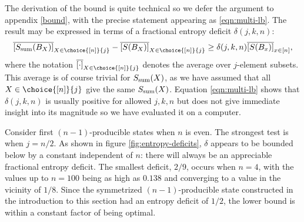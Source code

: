 \documentclass[12pt]{article}
\newcommand{\be}{\begin{equation}}
\newcommand{\ee}{\end{equation}}
\numberwithin{equation}{section}
\begin{document}
The derivation of the bound is quite technical so we defer the argument to appendix \ref{bound}, with the precise statement appearing as \eqref{eqn:multi-lb}.    The result may be expressed in terms of a fractional entropy deficit $\delta(j,k,n)$:
\be
\label{eqn:avbound}
\overline{[ S_{\rm{sum}}(B_X) ]}_{X \in \choice{[n]}{j}} - \overline{[ S(B_X) ]}_{X \in \choice{[n]}{j}}
\geq \delta(j,k,n) \overline{[ S(B_x)]}_{x \in [n]},
\ee
where the notation $\overline{[ \cdot ]}_{X \in \choice{[n]}{j}}$ denotes the average over $j$-element subsets.  This average is of course trivial for $S_{\rm{sum}}(X)$, as we have assumed that all $X \in \choice{[n]}{j}$ give the same $S_{\rm{sum}}(X)$.   Equation \eqref{eqn:multi-lb} shows that $\delta(j,k,n)$ is usually positive for allowed $j,k,n$ but does not give immediate insight into its magnitude so we have evaluated it on a computer.

Consider first $(n-1)$-producible states when $n$ is even. The strongest test is when $j = n/2$.  As shown in figure \ref{fig:entropy-deficits}, $\delta$ appears to be bounded below by a constant independent of $n$: there will always be an appreciable fractional entropy deficit. The smallest deficit, $2/9$, occurs when $n=4$, with the values up to $n=100$ being as high as $0.138$ and converging to a value in the vicinity of $1/8$. Since the symmetrized $(n-1)$-producible state constructed in the introduction to this section had an entropy deficit of $1/2$, the lower bound is within a constant factor of being optimal.
\end{document}

